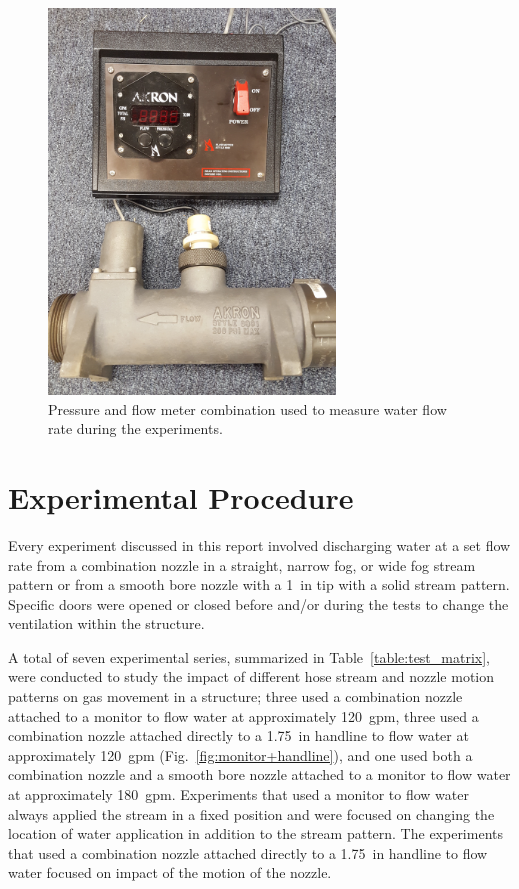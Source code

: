 \documentclass[12pt,oneside]{book}
\begin{document}
\begin{figure}[!ht]
	\includegraphics[width=3in]{../Figures/Pictures/flow_meter}
	\caption[Flow meter used to measure flow rate during experiments.]{Pressure and flow meter combination used to measure water flow rate during the experiments.}
	\label{fig:flow_meter}
\end{figure}
\FloatBarrier

\section{Experimental Procedure}
\label{sec:exp_procedure}
Every experiment discussed in this report involved discharging water at a set flow rate from a combination nozzle in a straight, narrow fog, or wide fog stream pattern or from a smooth bore nozzle with a 1~in tip with a solid stream pattern. Specific doors were opened or closed before and/or during the tests to change the ventilation within the structure. 

A total of seven experimental series, summarized in Table~\ref{table:test_matrix}, were conducted to study the impact of different hose stream and nozzle motion patterns on gas movement in a structure; three used a combination nozzle attached to a monitor to flow water at approximately 120~gpm, three used a combination nozzle attached directly to a 1.75~in handline to flow water at approximately 120~gpm (Fig.~\ref{fig:monitor+handline}), and one used both a combination nozzle and a smooth bore nozzle attached to a monitor to flow water at approximately 180~gpm. Experiments that used a monitor to flow water always applied the stream in a fixed position and were focused on changing the location of water application in addition to the stream pattern. The experiments that used a combination nozzle attached directly to a 1.75~in handline to flow water focused on impact of the motion of the nozzle.
\end{document}

